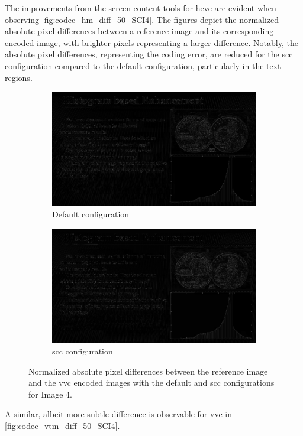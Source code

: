 The improvements from the screen content tools for \gls{hevc} are evident when observing \autoref{fig:codec_hm_diff_50_SCI4}.
The figures depict the normalized absolute pixel differences between a reference image and its corresponding encoded image, with brighter pixels representing a larger difference.
Notably, the absolute pixel differences, representing the coding error, are reduced for the \gls{scc} configuration compared to the default configuration, particularly in the text regions.
\begin{figure}
    \centering
    \begin{subfigure}[b]{0.45\textwidth}
        \includegraphics[width=\linewidth]{../images/codec_vtm_default_diff_50_SCI4.png}
        \caption{Default configuration}
        \label{fig:codec_vtm_default_diff_50_SCI4}
    \end{subfigure}
    \hfill
    \begin{subfigure}[b]{0.45\textwidth}
        \includegraphics[width=\linewidth]{../images/codec_vtm_scc_diff_50_SCI4.png}
        \caption{\gls{scc} configuration}
        \label{fig:codec_vtm_scc_diff_50_SCI4}
    \end{subfigure}
    \caption{Normalized absolute pixel differences between the reference image and the \gls{vvc} encoded images with the default and \gls{scc} configurations for Image 4.}
    \label{fig:codec_vtm_diff_50_SCI4}
\end{figure}
A similar, albeit more subtle difference is observable for \gls{vvc} in \autoref{fig:codec_vtm_diff_50_SCI4}.


